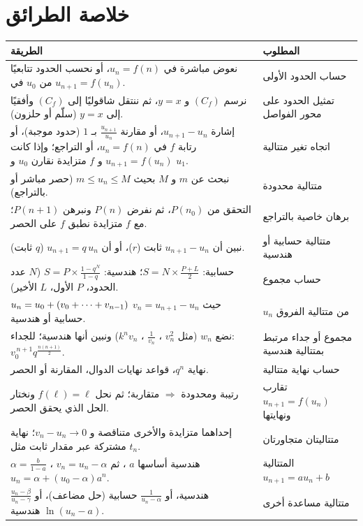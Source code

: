 \documentclass[12pt,a4paper]{article}
\renewcommand{\cdots}{\mathinner{\cdotp\cdotp\cdotp}}
\begin{document}
\section{خلاصة الطرائق}
\begin{center}
\renewcommand{\arraystretch}{1.25}
\begin{tabular}{|p{}|p{}|}\hline
\rowcolor{cSec!12}\textbf{الطريقة} & \textbf{المطلوب}\\\hline
نعوض مباشرة في $u_n=f(n)$، أو نحسب الحدود تتابعيًا من $u_0$ في $u_{n+1}=f(u_n)$. & حساب الحدود الأولى\\\hline
نرسم $(C_f)$ و $y=x$، ثم ننتقل شاقوليًا إلى $(C_f)$ وأفقيًا إلى $y=x$ (سلّم أو حلزون). & تمثيل الحدود على محور الفواصل\\\hline
إشارة $u_{n+1}-u_n$، أو مقارنة $\frac{u_{n+1}}{u_n}$ بـ $1$ (حدود موجبة)، أو رتابة $f$ في $u_n=f(n)$، أو التراجع؛ وإذا كانت $u_{n+1}=f(u_n)$ و $f$ متزايدة نقارن $u_0$ و $u_1$. & اتجاه تغير متتالية\\\hline
نبحث عن $m$ و $M$ بحيث $m\leqslant u_n\leqslant M$ (حصر مباشر أو بالتراجع). & متتالية محدودة\\\hline
التحقق من $P(n_0)$، ثم نفرض $P(n)$ ونبرهن $P(n+1)$؛ مع $f$ متزايدة نطبق $f$ على الحصر. & برهان خاصية بالتراجع\\\hline
نبين أن $u_{n+1}-u_n$ ثابت ($r$)، أو أن $u_{n+1}=q\,u_n$ ($q$ ثابت). & متتالية حسابية أو هندسية\\\hline
حسابية: $S=N\times\frac{P+L}{2}$؛ هندسية: $S=P\times\frac{1-q^{N}}{1-q}$ ($N$ عدد الحدود، $P$ الأول، $L$ الأخير). & حساب مجموع\\\hline
$u_n=u_0+(v_0+\cdots+v_{n-1})$ حيث $v_n=u_{n+1}-u_n$ حسابية أو هندسية. & $u_n$ من متتالية الفروق\\\hline
نضع $w_n$ (مثل $v_n^{2}$ ، $\frac{1}{v_n}$ ، $k^{n}v_n$) ونبين أنها هندسية؛ للجداء: $v_0^{\,n+1}q^{\frac{n(n+1)}{2}}$. & مجموع أو جداء مرتبط بمتتالية هندسية\\\hline
نهاية $q^{n}$، قواعد نهايات الدوال، المقارنة أو الحصر. & حساب نهاية متتالية\\\hline
رتيبة ومحدودة $\Rightarrow$ متقاربة؛ ثم نحل $f(\ell)=\ell$ ونختار الحل الذي يحقق الحصر. & تقارب $u_{n+1}=f(u_n)$ ونهايتها\\\hline
إحداهما متزايدة والأخرى متناقصة و $v_n-u_n\to0$؛ نهاية مشتركة عبر مقدار ثابت مثل $t_n$. & متتاليتان متجاورتان\\\hline
$\alpha=\frac{b}{1-a}$ ، $v_n=u_n-\alpha$ هندسية أساسها $a$ ، ثم $u_n=\alpha+(u_0-\alpha)a^{n}$. & المتتالية $u_{n+1}=au_n+b$\\\hline
$\frac{u_n-\beta}{u_n-\gamma}$ هندسية، أو $\frac{1}{u_n-\alpha}$ حسابية (حل مضاعف)، أو $\ln(u_n-a)$ هندسية. & متتالية مساعدة أخرى\\\hline
\end{tabular}
\end{center}
\end{document}
